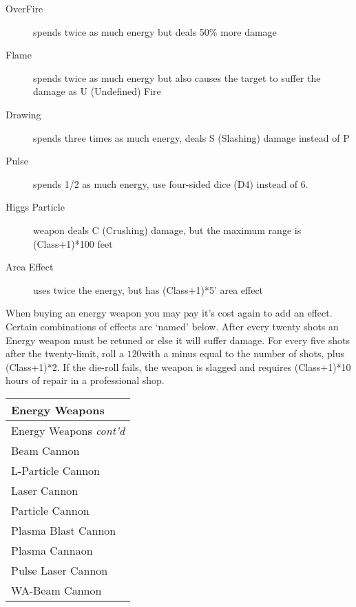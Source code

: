 \documentclass[twoside]{book}
\begin{document}
\begin{description}
    
  \item[ OverFire ]   spends twice as much energy but deals 50\% more
                 damage 
  \item[ Flame ]   spends twice as much energy but also causes the
                 target to suffer the damage as U (Undefined) Fire
                 
  \item[ Drawing ]   spends three times as much energy, deals S
                 (Slashing) damage instead of P 
  \item[ Pulse ]   spends 1/2 as much energy, use four-sided dice
                 (D4) instead of 6. 
  \item[ Higgs Particle ]   weapon deals C (Crushing) damage, but the maximum
                 range is (Class+1)*100 feet 
  \item[ Area Effect ]   uses twice the energy, but has (Class+1)*5'
                 area effect 
\end{description}
    When buying an energy weapon you may pay it's
               cost again to add an effect. Certain combinations of
               effects are `named' below.   After every twenty shots an Energy weapon must be
               retuned or else it will suffer damage. For every five
               shots after the twenty-limit, roll a \ensuremath{1}\ensuremath{20}\ensuremath{}with a minus
               equal to the number of shots, plus (Class+1)*2. If the
               die-roll fails, the weapon is slagged and requires
               (Class+1)*10 hours of repair in a professional shop.
               
\begin{longtable}{p{1.25in}} 
  Energy Weapons
  \\
  \hline
  \hline
  \endfirsthead
  Energy Weapons \textit{cont'd}
        
  \\
  \hline
  \endhead
      
  \raggedright
           Beam Cannon 
  \tabularnewline
      
  \raggedright
           L-Particle Cannon 
  \tabularnewline
      
  \raggedright
           Laser Cannon 
  \tabularnewline
      
  \raggedright
           Particle Cannon 
  \tabularnewline
      
  \raggedright
           Plasma Blast Cannon 
  \tabularnewline
      
  \raggedright
           Plasma Cannaon 
  \tabularnewline
      
  \raggedright
           Pulse Laser Cannon 
  \tabularnewline
      
  \raggedright
           WA-Beam Cannon 
  \tabularnewline
      
\end{longtable}
    
\end{document}
